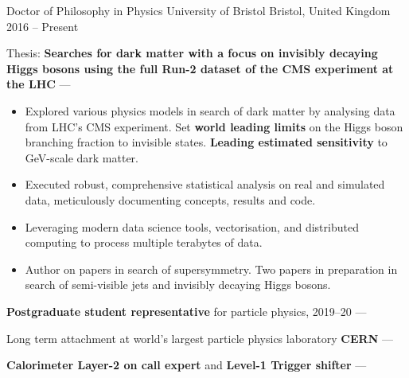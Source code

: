 
\def\vPaddingLength{0.75mm}
\newcommand{\vpaddingEduSubpoint}{\vspace{\vPaddingLength}} %


\begin{cventries}
    \cventry
        {Doctor of Philosophy in Physics} %
        {University of Bristol} %
        {Bristol, United Kingdom} %
        {2016 -- Present} %
        {
        \begin{cvitems} %
            \item {Thesis: \textbf{Searches for dark matter with a focus on invisibly decaying Higgs bosons using the full Run-2 dataset of the CMS experiment at the LHC} --- }
            \vpaddingEduSubpoint
            \begin{itemize}[itemsep=\vPaddingLength, label=\bullet]
                \item{Explored various physics models in search of dark matter by analysing data from LHC's CMS experiment. Set \textbf{world leading limits} on the Higgs boson branching fraction to invisible states. \textbf{Leading estimated sensitivity} to GeV-scale dark matter.}
                \item{Executed robust, comprehensive statistical analysis on real and simulated data, meticulously documenting concepts, results and code.}
                \item{Leveraging modern data science tools, vectorisation, and distributed computing to process multiple terabytes of data.}
                \item{Author on papers in search of supersymmetry. Two papers in preparation in search of semi-visible jets and invisibly decaying Higgs bosons.}
            \end{itemize}
            \item {\textbf{Postgraduate student representative} for particle physics, 2019--20 --- }
            \item {Long term attachment at world's largest particle physics laboratory \textbf{CERN} --- }
            \item {\textbf{Calorimeter Layer-2 on call expert} and \textbf{Level-1 Trigger shifter} --- }

\end{cvitems}}
\end{cventries}
